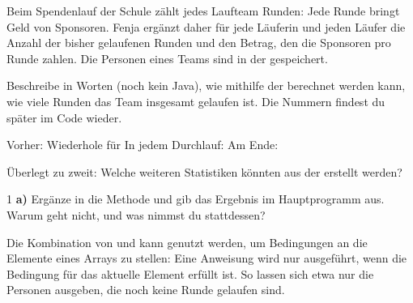 \documentclass[11pt,a4paper]{article}
\begin{document}

Beim Spendenlauf der Schule zählt jedes Laufteam Runden: Jede Runde bringt Geld von Sponsoren. Fenja ergänzt daher für jede Läuferin und jeden Läufer die Anzahl der bisher gelaufenen Runden und den Betrag, den die Sponsoren pro Runde zahlen. Die Personen eines Teams sind in der  gespeichert.

\begin{center}
\end{center}

Beschreibe in Worten (noch kein Java), wie mithilfe der  berechnet werden kann, wie viele Runden das Team insgesamt gelaufen ist. Die Nummern findest du später im Code wieder.

{\lueckentext
{} Vorher:
 Wiederhole für
 In jedem Durchlauf:
 Am Ende:\par}
Überlegt zu zweit: Welche weiteren Statistiken könnten aus der  erstellt werden?

\begin{aufgabe}{1}
\textbf{a)} Ergänze in  die Methode  und gib das Ergebnis im Hauptprogramm aus. Warum geht  nicht, und was nimmst du stattdessen?
\end{aufgabe}

\begin{merke}\lueckentext
Die Kombination von  und  kann genutzt werden, um Bedingungen an die Elemente eines Arrays zu stellen: Eine Anweisung wird nur ausgeführt, wenn die Bedingung für das aktuelle Element erfüllt ist. So lassen sich etwa nur die Personen ausgeben, die noch keine Runde gelaufen sind.
\end{merke}
\end{document}
